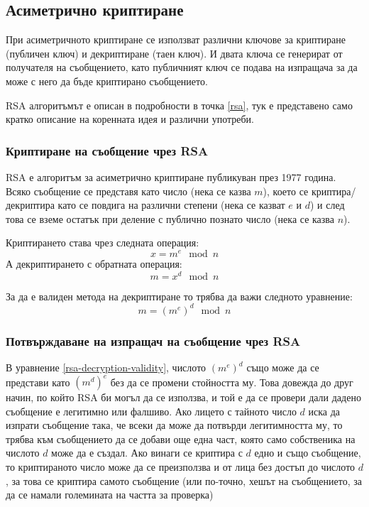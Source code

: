 
  \subsection{Асиметрично криптиране}
  При асиметричното криптиране се използват различни ключове за криптиране (публичен ключ) и декриптиране (таен ключ). И двата ключа се генерират от получателя на съобщението, като публичният ключ се подава на изпращача за да може с него да бъде криптирано съобщението.

  RSA алгоритъмът е описан в подробности в точка \ref{rsa}, тук е представено само кратко описание на коренната идея и различни употреби.

    \subsubsection{Криптиране на съобщение чрез RSA}
    RSA е алгоритъм за асиметрично криптиране публикуван през 1977 година.\cite{rsapaper} Всяко съобщение се представя като число (нека се казва $m$), което се криптира/декриптира като се повдига на различни степени (нека се казват $e$ и $d$) и след това се вземе остатък при деление с публично познато число (нека се казва $n$).

    Криптирането става чрез следната операция:
    \begin{equation}
      x = m^e \mod n
      \label{rsa-raising-to-e}
    \end{equation}
    А декриптирането с обратната операция:
    \begin{equation}
      m = x^d \mod n
      \label{rsa-raising-to-d}
    \end{equation}

    За да е валиден метода на декриптиране то трябва да важи следното уравнение:
    \begin{equation}
      m = (m^e)^d \mod n
      \label{rsa-decryption-validity}
    \end{equation}

    \subsubsection{Потвърждаване на изпращач на съобщение чрез RSA}
    В уравнение \ref{rsa-decryption-validity}, числото $(m^e)^d$ също може да се представи като $(m^d)^e$ без да се промени стойността му. Това довежда до друг начин, по който RSA би могъл да се използва, и той е да се провери дали дадено съобщение е легитимно или фалшиво. Ако лицето с тайното число $d$ иска да изпрати съобщение така, че всеки да може да потвърди легитимността му, то трябва към съобщението да се добави още една част, която само собственика на числото $d$ може да е създал. Ако винаги се криптира с $d$ едно и също съобщение, то криптираното число може да се преизползва и от лица без достъп до числото $d$, за това се криптира самото съобщение (или по-точно, хешът на съобщението, за да се намали големината на частта за проверка)


